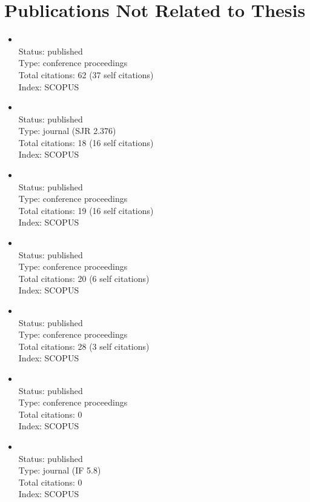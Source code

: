 \section*{Publications Not Related to Thesis}
    \begin{itemize}
		\item{}\vspace{2mm}\\Status: published\\Type: conference proceedings\\Total citations: 62 (37 self citations)\\Index: SCOPUS
		\item{}\vspace{2mm}\\Status: published\\Type: journal (SJR 2.376)\\Total citations: 18 (16 self citations)\\Index: SCOPUS
		\item{}\vspace{2mm}\\Status: published\\Type: conference proceedings\\Total citations: 19 (16 self citations)\\Index: SCOPUS
		\item{}\vspace{2mm}\\Status: published\\Type: conference proceedings\\Total citations: 20 (6 self citations)\\Index: SCOPUS
		\item{}\vspace{2mm}\\Status: published\\Type: conference proceedings\\Total citations: 28 (3 self citations)\\Index: SCOPUS
		\item{}\vspace{2mm}\\Status: published\\Type: conference proceedings\\Total citations: 0\\Index: SCOPUS
		\item{}\vspace{2mm}\\Status: published\\Type: journal (IF 5.8)\\Total citations: 0\\Index: SCOPUS

\end{itemize}
